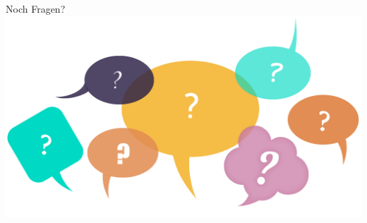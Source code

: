\documentclass[12pt, xcolor={usenames,dvipsnames,svgnames,x11names,table}]{beamer}
\begin{document}
	
	\section{}
	
	
	\section{}
	

	\section{}
	
	
	\section{}
	
	
	\section{}	
	
	
	\section{}
	\begin{frame}{Noch Fragen?}
		\includegraphics[width=\textwidth]{fragen}
	\end{frame}
\end{document}
